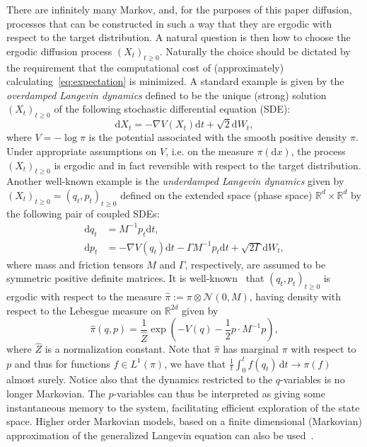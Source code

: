 There are infinitely many Markov, and, for the purposes of this paper diffusion, processes that can be constructed in such a way that they are ergodic with respect to the target distribution. A natural question is then how to choose the ergodic diffusion process $(X_{t})_{t\geq0}$. Naturally the choice should be dictated by the requirement that the computational cost of (approximately) calculating~\eqref{eq:expectation} is minimized. A standard example is given by the \emph{overdamped Langevin dynamics} defined to be
the unique (strong) solution $(X_{t})_{t\ge0}$ of the following stochastic differential equation
(SDE):
\begin{equation}
\mathrm{d}X_{t}=-\nabla V(X_{t})\mathrm{d}t+\sqrt{2}\mathrm{d}W_{t},\label{eq:overdamped}
\end{equation}
where $V=-\log\pi$ is the potential associated with the smooth positive
density $\pi$. Under appropriate assumptions on $V$, i.e. on the measure $\pi(\mathrm{d}x)$, the process $(X_{t})_{t\ge0}$ is ergodic and in fact reversible with respect to the target distribution.
\\
Another well-known example is the \emph{underdamped Langevin
dynamics} given by $(X_t)_{t\ge0} = (q_t, p_t)_{t\ge0}$ defined on the extended space (phase space) $\mathbb{R}^{d}\times\mathbb{\mathbb{R}}^{d}$ by the following pair of coupled SDEs:
\begin{equation}
\begin{aligned}\mathrm{d}q_{t} & =M^{-1}p_{t}\mathrm{d}t,\\
\mathrm{d}p_{t} & =-\nabla V(q_{t})\mathrm{d}t-\Gamma M^{-1}p_{t}\mathrm{d}t+\sqrt{2\Gamma}\mathrm{d}W_{t},
\end{aligned}
\label{eq:langevin}
\end{equation}
where mass and friction tensors $M$ and $\Gamma$, respectively, are assumed to be symmetric positive definite matrices. It is well-known~\cite{pavliotis2014stochastic,LS2016} that $(q_{t},p_{t})_{t\ge0}$ is ergodic with respect to the measure $\widehat{\pi}:=\pi\otimes\mathcal{N}(0,M)$, having density with respect to the Lebesgue measure on $\mathbb{R}^{2d}$ given by
\begin{equation}
\label{eq:augmented target}
\widehat{\pi}(q,p)=\frac{1}{\widehat{Z}}\exp\left(-V(q)-\frac{1}{2}p\cdot M^{-1}p\right),
\end{equation}
where $\widehat{Z}$ is a normalization constant. Note that $\widehat{\pi}$ has marginal $\pi$ with respect to $p$ and thus for functions $f\in L^{1}(\pi)$, we have that $\frac{1}{t}\int_0^t f(q_{t})\,\mathrm{d}t\rightarrow\pi(f)$ almost surely. Notice also that the dynamics restricted to the $q$-variables is no longer Markovian. The $p$-variables can thus be interpreted as giving some instantaneous memory to the system, facilitating efficient exploration of the state space. Higher order Markovian models, based on a finite dimensional (Markovian) approximation of the generalized Langevin equation can also be used~\cite{ceriotti_al09}.
